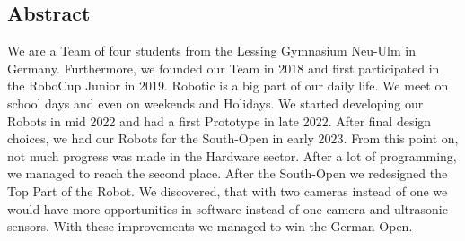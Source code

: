\subsection{Abstract}
We are a Team of four students from the Lessing Gymnasium Neu-Ulm in Germany. Furthermore, we founded our Team
in 2018 and first participated in the RoboCup Junior in 2019. Robotic is a big part of our daily life.
We meet on school days and even on weekends and Holidays.
\newline
\newline
We started developing our Robots in mid 2022 and had a first Prototype in late 2022. After final design
choices, we had our Robots for the South-Open in early 2023. From this point on, not much progress was
made in the Hardware sector.
After a lot of programming, we managed to reach the second place.
\newline
After the South-Open we redesigned the Top Part of the Robot. We discovered, that with two cameras
instead of one we would have more opportunities in software instead of one camera and ultrasonic sensors.
With these improvements we managed to win the German Open.